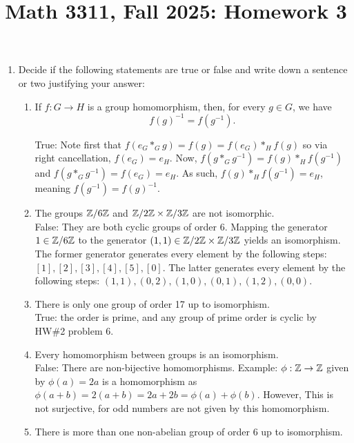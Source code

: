 \documentclass{amsart}
\title{Math 3311, Fall 2025: Homework 3}
\begin{document}
\maketitle



\begin{enumerate}[itemsep=0.4in]

\item Decide if the following statements are true or false and write down a sentence or two justifying your answer:
\begin{enumerate}[itemsep=0.2in]
    \item If $f:G\to H$ is a group homomorphism, then, for every $g\in G$, we have
    \[
     f(g)^{-1} = f(g^{-1}).
    \]

    True: Note first that $f(e_G*_Gg)=f(g)=f(e_G)*_Hf(g)$ so via right cancellation, $f(e_G)=e_H$. Now, $f(g*_Gg^{-1})=f(g)*_Hf(g^{-1})$ and $f(g*_Gg^{-1})=f(e_G)=e_H$. As such, $f(g)*_Hf(g^{-1})=e_H$, meaning $f(g^{-1})=f(g)^{-1}$.
    
    \item The groups $\mathbb{Z}/6\mathbb{Z}$ and $\mathbb{Z}/2\mathbb{Z}\times \mathbb{Z}/3\mathbb{Z}$ are not isomorphic.\\

    False: They are both cyclic groups of order $6$. Mapping the generator $1\in\mathbb{Z}/6\mathbb{Z}$ to the generator $(1,1)\in\mathbb{Z}/2\mathbb{Z}\times\mathbb{Z}/3\mathbb{Z}$ yields an isomorphism. The former generator generates every element by the following steps: $[1],[2],[3],[4],[5],[0]$. The latter generates every element by the following steps: $(1,1),(0,2),(1,0),(0,1),(1,2),(0,0)$.

    \item There is only one group of order 17 up to isomorphism.\\

    True: the order is prime, and any group of prime order is cyclic by HW\#2 problem 6.

    \item Every homomorphism between groups is an isomorphism.\\

    False: There are non-bijective homomorphisms. Example: $\phi:\mathbb{Z}\to\mathbb{Z}$ given by $\phi(a)=2a$ is a homomorphism as $\phi(a+b)=2(a+b)=2a+2b=\phi(a)+\phi(b)$. However, This is not surjective, for odd numbers are not given by this homomorphism.

    \item There is more than one non-abelian group of order $6$ up to isomorphism.\\


\end{enumerate}
\end{enumerate}
\end{document}
